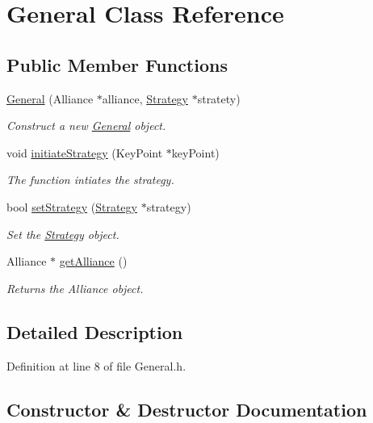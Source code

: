 \hypertarget{classGeneral}{}\section{General Class Reference}
\label{classGeneral}
\subsection*{Public Member Functions}
\begin{DoxyCompactItemize}
\item 
\hyperlink{classGeneral_a713f0749ceab81e918373adde7b18885}{General} (Alliance $\ast$alliance, \hyperlink{classStrategy}{Strategy} $\ast$stratety)
\begin{DoxyCompactList}\small\item\em Construct a new \hyperlink{classGeneral}{General} object. \end{DoxyCompactList}\item 
void \hyperlink{classGeneral_a7a2239276a120f53446cb60b24d61496}{initiate\+Strategy} (Key\+Point $\ast$key\+Point)
\begin{DoxyCompactList}\small\item\em The function intiates the strategy. \end{DoxyCompactList}\item 
bool \hyperlink{classGeneral_abe8dcb93ddb9b79bd8e75e8c642758ba}{set\+Strategy} (\hyperlink{classStrategy}{Strategy} $\ast$strategy)
\begin{DoxyCompactList}\small\item\em Set the \hyperlink{classStrategy}{Strategy} object. \end{DoxyCompactList}\item 
Alliance $\ast$ \hyperlink{classGeneral_a4cff7ae050a44bbbd077f4257078291c}{get\+Alliance} ()
\begin{DoxyCompactList}\small\item\em Returns the Alliance object. \end{DoxyCompactList}\end{DoxyCompactItemize}


\subsection{Detailed Description}


Definition at line 8 of file General.\+h.



\subsection{Constructor \& Destructor Documentation}
\mbox{\label{classGeneral_a713f0749ceab81e918373adde7b18885}} 
